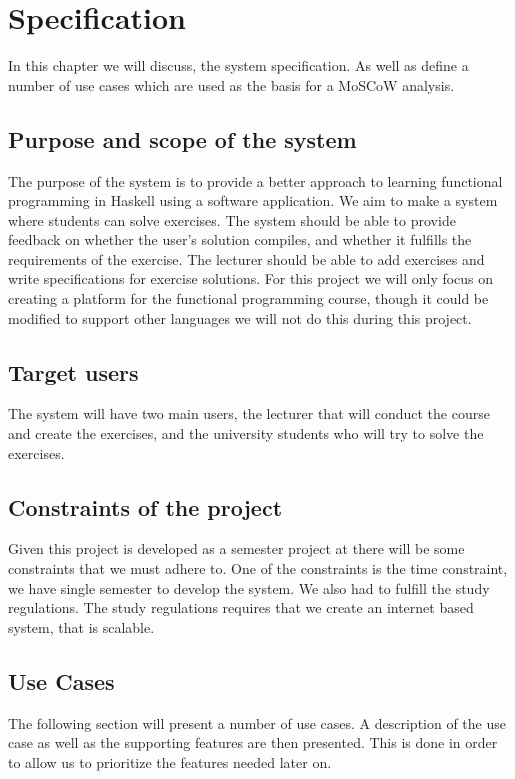 \chapter{Specification}
In this chapter we will discuss, the system specification. 
As well as define a number of use cases which are used as the basis for a MoSCoW analysis. 


\section*{Purpose and scope of the system }
The purpose of the system is to provide a better approach to learning functional programming in Haskell using a software application.
We aim to make a system where students can solve exercises. The system should be able to provide feedback on whether the user's solution compiles, and whether it fulfills the requirements of the exercise. The lecturer should be able to add exercises and write specifications for exercise solutions.
For this project we will only focus on creating a platform for the functional programming course, though it could be modified to support other languages we will not do this during this project. 

\section*{Target users}
The system will have two main users, the lecturer that will conduct the course and create the exercises, and the university students who will try to solve the exercises.


\section*{Constraints of the project}
Given this project is developed as a semester project at \aau{} there will be some constraints that we must adhere to. 
One of the constraints is the time constraint, we have single semester to develop the system. 
We also had to fulfill the study regulations. The study regulations requires that we create an internet based system, that is scalable. 
 
\section*{Use Cases}
The following section will present a number of use cases. 
A description of the use case as well as the supporting features are then presented. 
This is done in order to allow us to prioritize the features needed later on.

